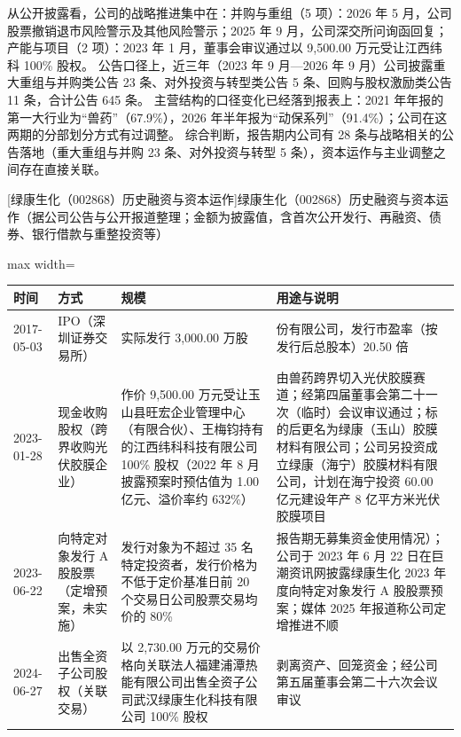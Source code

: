  从公开披露看，公司的战略推进集中在：并购与重组（5 项）：2026 年 5 月，公司股票撤销退市风险警示及其他风险警示；2025 年 9 月，公司深交所问询函回复；产能与项目（2 项）：2023 年 1 月，董事会审议通过以 9,500.00 万元受让江西纬科 100\% 股权。 公告口径上，近三年（2023 年 9 月---2026 年 9 月）公司披露重大重组与并购类公告 23 条、对外投资与转型类公告 5 条、回购与股权激励类公告 11 条，合计公告 645 条。 主营结构的口径变化已经落到报表上：2021 年年报的第一大行业为“兽药”（67.9\%），2026 年半年报为“动保系列”（91.4\%）；公司在这两期的分部划分方式有过调整。 综合判断，报告期内公司有 28 条与战略相关的公告落地（重大重组与并购 23 条、对外投资与转型 5 条），资本运作与主业调整之间存在直接关联。

\begin{center}\small\setlength{\tabcolsep}{4pt}
[绿康生化（002868）历史融资与资本运作]{绿康生化（002868）历史融资与资本运作（据公司公告与公开报道整理；金额为披露值，含首次公开发行、再融资、债券、银行借款与重整投资等）}
\begin{adjustbox}{max width=\textwidth}
\begin{tabular}{@{}p{1.45cm}p{2.55cm}p{4.05cm}p{4.95cm}@{}}
\toprule
时间 & 方式 & 规模 & 用途与说明 \\
\midrule
2017-05-03 & IPO（深圳证券交易所） & 实际发行 3,\allowbreak{}000.00 万股 & 份有限公司，\allowbreak{}发行市盈率（按发行后总股本）20.50 倍 \\
2023-01-28 & 现金收购股权（跨界收购光伏胶膜企业） & 作价 9,\allowbreak{}500.00 万元受让玉山县旺宏企业管理中心（有限合伙）、\allowbreak{}王梅钧持有的江西纬科科技有限公司 100\% 股权（2022 年 8 月披露预案时预估值为 1.00 亿元、\allowbreak{}溢价率约 632\%） & 由兽药跨界切入光伏胶膜赛道；经第四届董事会第二十一次（临时）会议审议通过；标的后更名为绿康（玉山）胶膜材料有限公司；公司另投资成立绿康（海宁）胶膜材料有限公司，\allowbreak{}计划在海宁投资 60.00 亿元建设年产 8 亿平方米光伏胶膜项目 \\
2023-06-22 & 向特定对象发行 A 股股票（定增预案，未实施） & 发行对象为不超过 35 名特定投资者，\allowbreak{}发行价格为不低于定价基准日前 20 个交易日公司股票交易均价的 80\% & 报告期无募集资金使用情况）；公司于 2023 年 6 月 22 日在巨潮资讯网披露绿康生化 2023 年度向特定对象发行 A 股股票预案；媒体 2025 年报道称公司定增推进不顺 \\
2024-06-27 & 出售全资子公司股权（关联交易） & 以 2,\allowbreak{}730.00 万元的交易价格向关联法人福建浦潭热能有限公司出售全资子公司武汉绿康生化科技有限公司 100\% 股权 & 剥离资产、\allowbreak{}回笼资金；经公司第五届董事会第二十六次会议审议 \\

\end{tabular}
\end{adjustbox}
\end{center}

